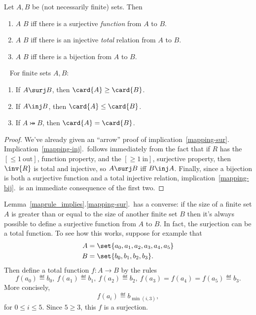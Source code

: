 \begin{definition}\label{bigger}
  Let $A,B$ be (not necessarily finite) sets.  Then
  \begin{enumerate}
  \item $A$ \term{$\surj$} $B$ iff there is a surjective
    \emph{function} from $A$ to $B$.

  \item $A$ \term{$\inj$} $B$ iff there is an injective
    \emph{total} relation from $A$ to $B$.

  \item $A$ \term{$\bij$} $B$ iff there is a bijection from $A$ to
    $B$.

  \end{enumerate}
\end{definition}

\begin{lemma}\label{maprule_implies}  \mbox{ }
For finite sets $A,B$:

\begin{enumerate}

\item\label{mapping-sur} If $A \surj B$, then $\card{A} \geq
  \card{B}$.

\item\label{mapping-inj} If $A \inj B$, then $\card{A} \leq \card{B}$.

\item\label{mapping-bij} If $A \bij B$, then $\card{A} = \card{B}$.
\end{enumerate}

\end{lemma}

\begin{proof}
 We've already given an ``arrow'' proof of
 implication~\ref{mapping-sur}.
 Implication~\ref{mapping-inj}.\ follows immediately from the fact
 that if $R$ has the $[\le 1\ \text{out}]$, function property, and the
 $[\ge 1\ \text{in}]$, surjective property, then $\inv{R}$ is total
 and injective, so $A \surj B$ iff $B \inj A$.  Finally, since a
 bijection is both a surjective function and a total injective
 relation, implication~\ref{mapping-bij}.\ is an immediate consequence
 of the first two.
\end{proof}

Lemma~\ref{maprule_implies}.\ref{mapping-sur}.\ has a converse: if the
size of a finite set $A$ is greater than or equal to the size of
another finite set $B$ then it's always possible to define a
surjective function from $A$ to $B$.  In fact, the surjection can be a
total function.  To see how this works, suppose for example that
\begin{align*}
A & =\set{a_0,a_1,a_2,a_3,a_4,a_5}\\ B & =\set{b_0,b_1,b_2,b_3}.
\end{align*}
Then define a total function $f:A\to B$ by the rules
\[
f(a_0) \eqdef b_0,\ f(a_1) \eqdef b_1,\ f(a_2) \eqdef b_2,\ f(a_3)=
f(a_4)=f(a_5) \eqdef b_3.
\]
More concisely,
\[
f(a_i) \eqdef b_{\min(i,3)},
\]
for $0 \le i \le 5$.  Since $5 \geq 3$, this $f$ is a surjection.
\iffalse In fact, if $A$ and $B$ are finite sets of the same size,
then we could also define a bijection from $A$ to $B$ by this method.
\fi 


